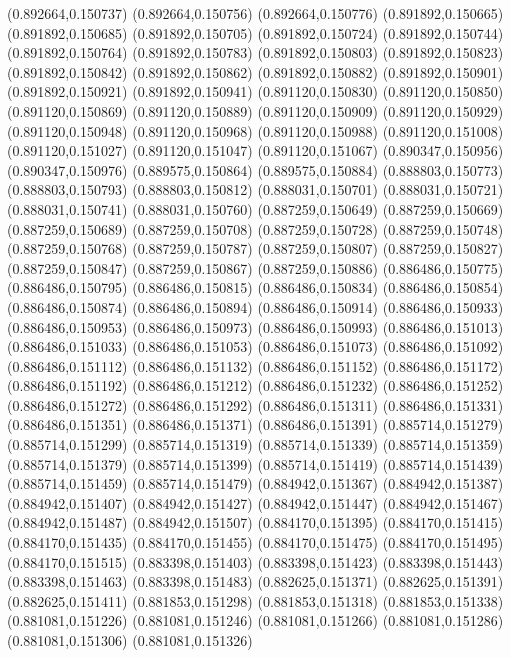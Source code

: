 (0.892664,0.150737)
(0.892664,0.150756)
(0.892664,0.150776)
(0.891892,0.150665)
(0.891892,0.150685)
(0.891892,0.150705)
(0.891892,0.150724)
(0.891892,0.150744)
(0.891892,0.150764)
(0.891892,0.150783)
(0.891892,0.150803)
(0.891892,0.150823)
(0.891892,0.150842)
(0.891892,0.150862)
(0.891892,0.150882)
(0.891892,0.150901)
(0.891892,0.150921)
(0.891892,0.150941)
(0.891120,0.150830)
(0.891120,0.150850)
(0.891120,0.150869)
(0.891120,0.150889)
(0.891120,0.150909)
(0.891120,0.150929)
(0.891120,0.150948)
(0.891120,0.150968)
(0.891120,0.150988)
(0.891120,0.151008)
(0.891120,0.151027)
(0.891120,0.151047)
(0.891120,0.151067)
(0.890347,0.150956)
(0.890347,0.150976)
(0.889575,0.150864)
(0.889575,0.150884)
(0.888803,0.150773)
(0.888803,0.150793)
(0.888803,0.150812)
(0.888031,0.150701)
(0.888031,0.150721)
(0.888031,0.150741)
(0.888031,0.150760)
(0.887259,0.150649)
(0.887259,0.150669)
(0.887259,0.150689)
(0.887259,0.150708)
(0.887259,0.150728)
(0.887259,0.150748)
(0.887259,0.150768)
(0.887259,0.150787)
(0.887259,0.150807)
(0.887259,0.150827)
(0.887259,0.150847)
(0.887259,0.150867)
(0.887259,0.150886)
(0.886486,0.150775)
(0.886486,0.150795)
(0.886486,0.150815)
(0.886486,0.150834)
(0.886486,0.150854)
(0.886486,0.150874)
(0.886486,0.150894)
(0.886486,0.150914)
(0.886486,0.150933)
(0.886486,0.150953)
(0.886486,0.150973)
(0.886486,0.150993)
(0.886486,0.151013)
(0.886486,0.151033)
(0.886486,0.151053)
(0.886486,0.151073)
(0.886486,0.151092)
(0.886486,0.151112)
(0.886486,0.151132)
(0.886486,0.151152)
(0.886486,0.151172)
(0.886486,0.151192)
(0.886486,0.151212)
(0.886486,0.151232)
(0.886486,0.151252)
(0.886486,0.151272)
(0.886486,0.151292)
(0.886486,0.151311)
(0.886486,0.151331)
(0.886486,0.151351)
(0.886486,0.151371)
(0.886486,0.151391)
(0.885714,0.151279)
(0.885714,0.151299)
(0.885714,0.151319)
(0.885714,0.151339)
(0.885714,0.151359)
(0.885714,0.151379)
(0.885714,0.151399)
(0.885714,0.151419)
(0.885714,0.151439)
(0.885714,0.151459)
(0.885714,0.151479)
(0.884942,0.151367)
(0.884942,0.151387)
(0.884942,0.151407)
(0.884942,0.151427)
(0.884942,0.151447)
(0.884942,0.151467)
(0.884942,0.151487)
(0.884942,0.151507)
(0.884170,0.151395)
(0.884170,0.151415)
(0.884170,0.151435)
(0.884170,0.151455)
(0.884170,0.151475)
(0.884170,0.151495)
(0.884170,0.151515)
(0.883398,0.151403)
(0.883398,0.151423)
(0.883398,0.151443)
(0.883398,0.151463)
(0.883398,0.151483)
(0.882625,0.151371)
(0.882625,0.151391)
(0.882625,0.151411)
(0.881853,0.151298)
(0.881853,0.151318)
(0.881853,0.151338)
(0.881081,0.151226)
(0.881081,0.151246)
(0.881081,0.151266)
(0.881081,0.151286)
(0.881081,0.151306)
(0.881081,0.151326)
